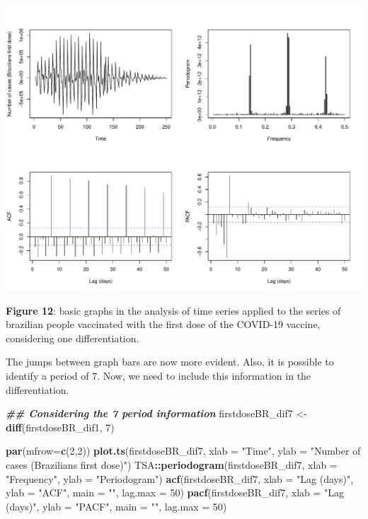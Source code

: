 \documentclass[
]{article}
\newenvironment{Shaded}{\begin{snugshade}}{\end{snugshade}}
\newcommand{\AttributeTok}[1]{\textcolor[rgb]{0.13,0.29,0.53}{#1}}
\newcommand{\DecValTok}[1]{\textcolor[rgb]{0.00,0.00,0.81}{#1}}
\newcommand{\DocumentationTok}[1]{\textcolor[rgb]{0.56,0.35,0.01}{\textbf{\textit{#1}}}}
\newcommand{\FunctionTok}[1]{\textcolor[rgb]{0.13,0.29,0.53}{\textbf{#1}}}
\newcommand{\NormalTok}[1]{#1}
\newcommand{\OtherTok}[1]{\textcolor[rgb]{0.56,0.35,0.01}{#1}}
\newcommand{\SpecialCharTok}[1]{\textcolor[rgb]{0.81,0.36,0.00}{\textbf{#1}}}
\newcommand{\StringTok}[1]{\textcolor[rgb]{0.31,0.60,0.02}{#1}}
\renewenvironment{Shaded}{\begin{mdframed}[ backgroundcolor=shadecolor, linecolor = shadecolor, leftmargin=\dimexpr\leftmargin-2pt\relax, innerleftmargin=1.6pt, innertopmargin=5pt, skipabove=10pt,skipbelow=3pt ]}{\end{mdframed}}
\begin{document}
\begin{center}\includegraphics[width=\linewidth]{IF_results_ENG_files/figure-latex/unnamed-chunk-14-1} \end{center}

\textbf{Figure 12}: basic graphs in the analysis of time series applied
to the series of brazilian people vaccinated with the first dose of the
COVID-19 vaccine, considering one differentiation.

The jumps between graph bars are now more evident. Also, it is possible
to identify a period of 7. Now, we need to include this information in
the differentiation.

\begin{Shaded}
\begin{Highlighting}[]
\DocumentationTok{\#\# Considering the 7 period information}
\NormalTok{firstdoseBR\_dif7 }\OtherTok{\textless{}{-}} \FunctionTok{diff}\NormalTok{(firstdoseBR\_dif1, }\DecValTok{7}\NormalTok{)}

\FunctionTok{par}\NormalTok{(}\AttributeTok{mfrow=}\FunctionTok{c}\NormalTok{(}\DecValTok{2}\NormalTok{,}\DecValTok{2}\NormalTok{))}
\FunctionTok{plot.ts}\NormalTok{(firstdoseBR\_dif7,}
        \AttributeTok{xlab =} \StringTok{"Time"}\NormalTok{,}
        \AttributeTok{ylab =} \StringTok{"Number of cases (Brazilians first dose)"}\NormalTok{)}
\NormalTok{TSA}\SpecialCharTok{::}\FunctionTok{periodogram}\NormalTok{(firstdoseBR\_dif7,}
                 \AttributeTok{xlab =} \StringTok{"Frequency"}\NormalTok{,}
                 \AttributeTok{ylab =} \StringTok{"Periodogram"}\NormalTok{)}
\FunctionTok{acf}\NormalTok{(firstdoseBR\_dif7,}
    \AttributeTok{xlab =} \StringTok{"Lag (days)"}\NormalTok{,}
    \AttributeTok{ylab =} \StringTok{"ACF"}\NormalTok{,}
    \AttributeTok{main =} \StringTok{""}\NormalTok{,}
    \AttributeTok{lag.max =} \DecValTok{50}\NormalTok{)}
\FunctionTok{pacf}\NormalTok{(firstdoseBR\_dif7,}
     \AttributeTok{xlab =} \StringTok{"Lag (days)"}\NormalTok{,}
     \AttributeTok{ylab =} \StringTok{"PACF"}\NormalTok{,}
     \AttributeTok{main =} \StringTok{""}\NormalTok{,}
     \AttributeTok{lag.max =} \DecValTok{50}\NormalTok{)}
\end{Highlighting}
\end{Shaded}
\end{document}
